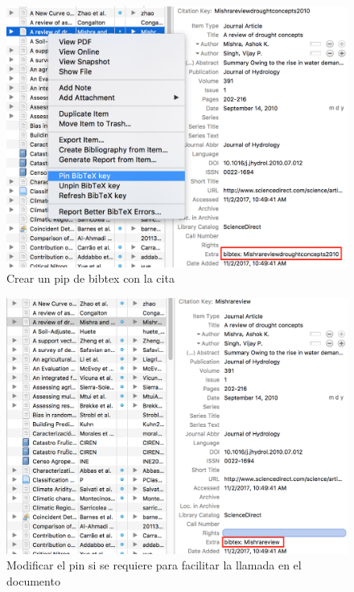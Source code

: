 \documentclass[11pt,]{article}
\begin{document}
\begin{figure}[!h]
\begin{center}
\includegraphics[width=\textwidth]{Figuras/zotero_pin.png}
\caption{Crear un pip de bibtex con la cita}
\label{etiqueta_figura3}
\end{center}
\end{figure}

\begin{figure}[!h]
\begin{center}
\includegraphics[width=\textwidth]{Figuras/zotero_pin2.png}
\caption{Modificar el pin si se requiere para facilitar la llamada en el documento}
\label{etiqueta_figura4}
\end{center}
\end{figure}
\end{document}
